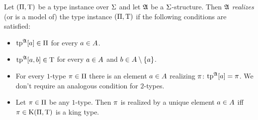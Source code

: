 \begin{definition}
Let $(\Pi,\mathrm{T})$ be a type instance over $\mathrm{\Sigma}$ and let $\mathfrak{A}$ be a
$\mathrm{\Sigma}$-structure.
Then $\mathfrak{A}$ \emph{realizes} (or is
a model of) the type instance $(\Pi,\mathrm{T})$ if the following conditions are satisfied:
\begin{itemize}
  \item[\condrealizI]\label{cond:realizI}
  $\operatorname{tp}^{\mathfrak{A}}[a] \in \Pi$ for every $a\in A$.
  \item[\condrealizII]\label{cond:realizII}
  $\operatorname{tp}^{\mathfrak{A}}[a,b] \in \mathrm{T}$ for every $a\in A$
  and $b \in A\setminus\left\{a\right\}$.
  \item[\condrealizp]\label{cond:realizp}
  For every  $1$-type $\pi \in \Pi$ there is
  an element $a \in A$ realizing $\pi$: $\operatorname{tp}^{\mathfrak{A}}[a] = \pi$.
  We don't require an analogous condition for $2$-types.
  \item[\condrealizk]\label{cond:realizk}
  Let $\pi \in \Pi$ be any $1$-type. Then $\pi$ is realized by
  a unique element $a \in A$ iff $\pi \in \mathrm{K}(\Pi,\mathrm{T})$ is a king
  type.
\end{itemize}
\end{definition}

